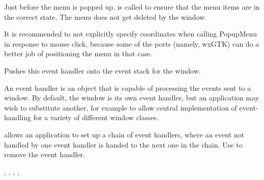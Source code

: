 


Just before the menu is popped up, 
is called to ensure that the menu items are in the correct state. The menu does
not get deleted by the window.

It is recommended to not explicitly specify coordinates when calling PopupMenu
in response to mouse click, because some of the ports (namely, wxGTK) can do
a better job of positioning the menu in that case.



\label{wxwindowpusheventhandler}


Pushes this event handler onto the event stack for the window.




An event handler is an object that is capable of processing the events
sent to a window. By default, the window is its own event handler, but
an application may wish to substitute another, for example to allow
central implementation of event-handling for a variety of different
window classes.

 allows
an application to set up a chain of event handlers, where an event not handled by one event handler is
handed to the next one in the chain. Use  to
remove the event handler.


,\rtfsp
{},\rtfsp
{},\rtfsp
{},\rtfsp
{}


